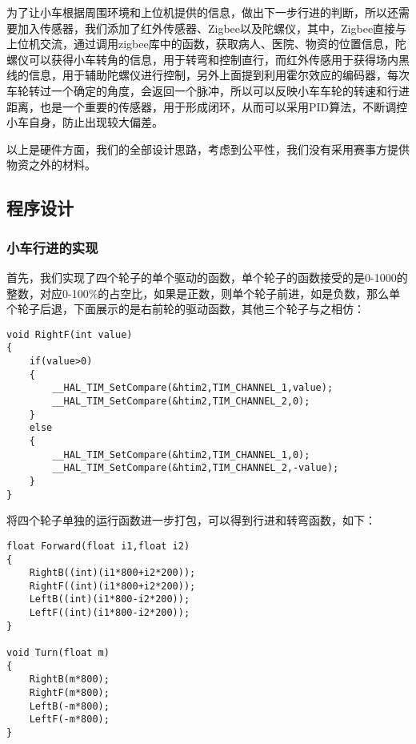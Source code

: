 \documentclass[UTF8]{ctexart}
\begin{document}
为了让小车根据周围环境和上位机提供的信息，做出下一步行进的判断，所以还需要加入传感器，我们添加了红外传感器、Zigbee以及陀螺仪，其中，Zigbee直接与上位机交流，通过调用zigbee库中的函数，获取病人、医院、物资的位置信息，陀螺仪可以获得小车转角的信息，用于转弯和控制直行，而红外传感用于获得场内黑线的信息，用于辅助陀螺仪进行控制，另外上面提到利用霍尔效应的编码器，每次车轮转过一个确定的角度，会返回一个脉冲，所以可以反映小车车轮的转速和行进距离，也是一个重要的传感器，用于形成闭环，从而可以采用PID算法，不断调控小车自身，防止出现较大偏差。

以上是硬件方面，我们的全部设计思路，考虑到公平性，我们没有采用赛事方提供物资之外的材料。

\subsection{程序设计}
\subsubsection{小车行进的实现}

首先，我们实现了四个轮子的单个驱动的函数，单个轮子的函数接受的是0-1000的整数，对应0-100$\%$的占空比，如果是正数，则单个轮子前进，如是负数，那么单个轮子后退，下面展示的是右前轮的驱动函数，其他三个轮子与之相仿：
\begin{lstlisting}
void RightF(int value)
{
	if(value>0)
	{
        __HAL_TIM_SetCompare(&htim2,TIM_CHANNEL_1,value);
        __HAL_TIM_SetCompare(&htim2,TIM_CHANNEL_2,0);
	}
	else
	{
        __HAL_TIM_SetCompare(&htim2,TIM_CHANNEL_1,0);
        __HAL_TIM_SetCompare(&htim2,TIM_CHANNEL_2,-value);
	}
}
\end{lstlisting}

将四个轮子单独的运行函数进一步打包，可以得到行进和转弯函数，如下：
\begin{lstlisting}
float Forward(float i1,float i2)
{
	RightB((int)(i1*800+i2*200));
	RightF((int)(i1*800+i2*200));
	LeftB((int)(i1*800-i2*200));
	LeftF((int)(i1*800-i2*200));
}

void Turn(float m)
{
	RightB(m*800);
	RightF(m*800);
	LeftB(-m*800);
	LeftF(-m*800);
}
\end{lstlisting}
\end{document}
